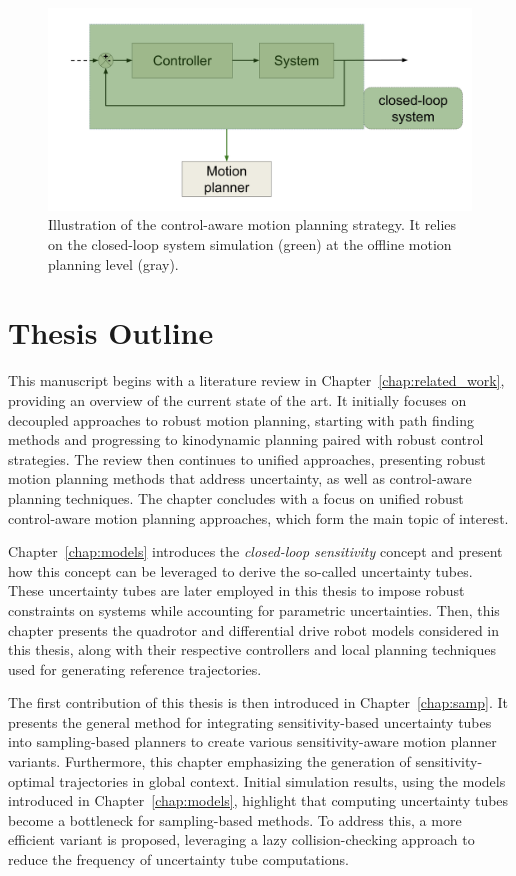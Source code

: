 \begin{figure} [htp]
    \centering
    \includegraphics[width=0.9\linewidth]{figures/intro/control-aware.png} 
    \caption{Illustration of the control-aware motion planning strategy.
    It relies on the closed-loop system simulation (green) at the offline motion planning level (gray).}%
    \label{fig:ca_strat}%
  \end{figure}

\section{Thesis Outline}

This manuscript begins with a literature review in Chapter~\ref{chap:related_work}, providing an overview of the current state of the art. 
It initially focuses on decoupled approaches to robust motion planning, starting with path finding methods and progressing to kinodynamic planning paired with robust control strategies.
The review then continues to unified approaches, presenting robust motion planning methods that address uncertainty, as well as control-aware planning techniques. 
The chapter concludes with a focus on unified robust control-aware motion planning approaches, which form the main topic of interest.

Chapter~\ref{chap:models} introduces the \emph{closed-loop sensitivity} concept and present how this concept can be leveraged to derive the so-called uncertainty tubes.
These uncertainty tubes are later employed in this thesis to impose robust constraints on systems while accounting for parametric uncertainties.
Then, this chapter presents the quadrotor and differential drive robot models considered in this thesis, along with their respective controllers and local planning techniques used for generating reference trajectories.

The first contribution of this thesis is then introduced in Chapter~\ref{chap:samp}.
It presents the general method for integrating sensitivity-based uncertainty tubes into sampling-based planners to create various sensitivity-aware motion planner variants.
Furthermore, this chapter emphasizing the generation of sensitivity-optimal trajectories in global context.
Initial simulation results, using the models introduced in Chapter~\ref{chap:models}, highlight that computing uncertainty tubes become a bottleneck for sampling-based methods.
To address this, a more efficient variant is proposed, leveraging a lazy collision-checking approach to reduce the frequency of uncertainty tube computations.

